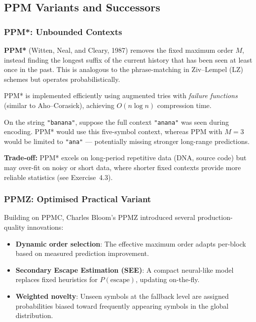 \subsection{PPM Variants and Successors}

\subsubsection{PPM*: Unbounded Contexts}

\begin{definitionbox}
\textbf{PPM*} (Witten, Neal, and Cleary, 1987) removes the fixed maximum order $M$,
instead finding the longest suffix of the current history that has been seen at least
once in the past. This is analogous to the phrase-matching in Ziv--Lempel (LZ)
schemes but operates probabilistically.
\end{definitionbox}

PPM* is implemented efficiently using augmented tries with \emph{failure functions}
(similar to Aho--Corasick), achieving $O(n \log n)$ compression time.

\begin{examplebox}
On the string \texttt{"banana"}, suppose the full context \texttt{"anana"} was
seen during encoding. PPM* would use this five-symbol context, whereas PPM with
$M=3$ would be limited to \texttt{"ana"} --- potentially missing stronger
long-range predictions.
\end{examplebox}

\textbf{Trade-off:} PPM* excels on long-period repetitive data (DNA, source code)
but may over-fit on noisy or short data, where shorter fixed contexts provide more
reliable statistics (see Exercise~4.3).

\subsubsection{PPMZ: Optimised Practical Variant}

Building on PPMC, Charles Bloom's PPMZ introduced several production-quality
innovations:
\begin{itemize}
    \item \textbf{Dynamic order selection}: The effective maximum order adapts
          per-block based on measured prediction improvement.
    \item \textbf{Secondary Escape Estimation (SEE)}: A compact neural-like model
          replaces fixed heuristics for $P(\text{escape})$, updating on-the-fly.
    \item \textbf{Weighted novelty}: Unseen symbols at the fallback level are
          assigned probabilities biased toward frequently appearing symbols in the
          global distribution.
\end{itemize}

